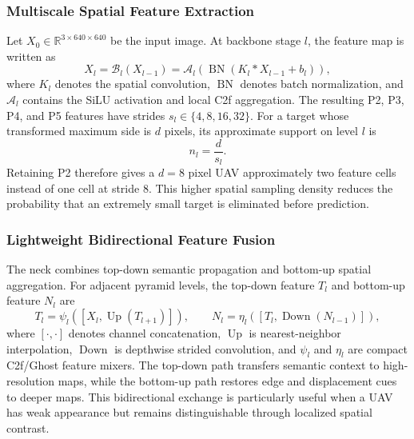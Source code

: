 \subsubsection{Multiscale Spatial Feature Extraction}
Let $X_0\in\mathbb{R}^{3\times640\times640}$ be the input image. At backbone stage $l$, the feature map is written as
\begin{equation}
X_l=\mathcal{B}_l(X_{l-1})=\mathcal{A}_l\!\left(\operatorname{BN}(K_l*X_{l-1}+b_l)\right),
\label{eq:backbone}
\end{equation}
where $K_l$ denotes the spatial convolution, $\operatorname{BN}$ denotes batch normalization, and $\mathcal{A}_l$ contains the SiLU activation and local C2f aggregation. The resulting P2, P3, P4, and P5 features have strides $s_l\in\{4,8,16,32\}$. For a target whose transformed maximum side is $d$ pixels, its approximate support on level $l$ is
\begin{equation}
n_l=\frac{d}{s_l}.
\label{eq:targetsupport}
\end{equation}
Retaining P2 therefore gives a $d=8$ pixel UAV approximately two feature cells instead of one cell at stride 8. This higher spatial sampling density reduces the probability that an extremely small target is eliminated before prediction.

\subsubsection{Lightweight Bidirectional Feature Fusion}
The neck combines top-down semantic propagation and bottom-up spatial aggregation. For adjacent pyramid levels, the top-down feature $T_l$ and bottom-up feature $N_l$ are
\begin{equation}
T_l=\psi_l\!\left(\left[X_l,\operatorname{Up}(T_{l+1})\right]\right),\qquad
N_l=\eta_l\!\left(\left[T_l,\operatorname{Down}(N_{l-1})\right]\right),
\label{eq:neck}
\end{equation}
where $[\cdot,\cdot]$ denotes channel concatenation, $\operatorname{Up}$ is nearest-neighbor interpolation, $\operatorname{Down}$ is depthwise strided convolution, and $\psi_l$ and $\eta_l$ are compact C2f/Ghost feature mixers. The top-down path transfers semantic context to high-resolution maps, while the bottom-up path restores edge and displacement cues to deeper maps. This bidirectional exchange is particularly useful when a UAV has weak appearance but remains distinguishable through localized spatial contrast.

